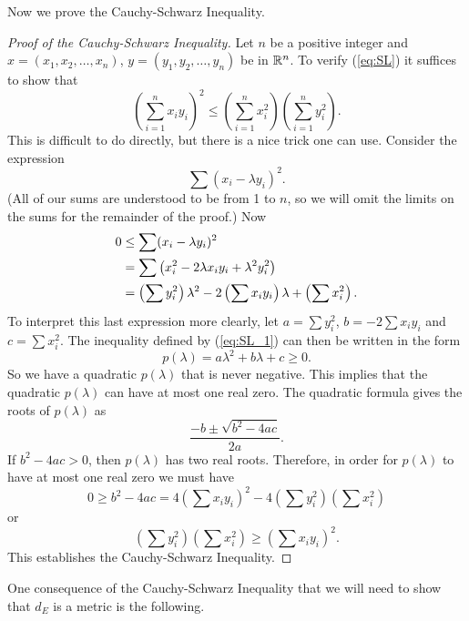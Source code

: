 {\begin{comment}
	\item Here we have 
	\[\sum_{i=1}^3 x_iy_i = (1)(-4) + (2)(0) + (-3)(-1) = -1\]
	and
	\[\left(\sqrt{\sum_{i=1}^3 x_i^2}\right) \left(\sqrt{\sum_{i=1}^3 y_i^2}\right) = \sqrt{1+4+9}\sqrt{16+0+1} = \sqrt{238} \approx 15.4.\]

	\ea

\end{comment}

Now we prove the Cauchy-Schwarz Inequality.

\begin{proof}[Proof of the Cauchy-Schwarz Inequality]  Let $n$ be a positive integer and $x = (x_1, x_2, \ldots, x_n)$, $y=(y_1, y_2, \ldots, y_n)$ be in $\mathbb{R}^n$. To verify (\ref{eq:SL}) it suffices to show that 
\[\left(\sum_{i=1}^n x_iy_i\right)^2 \leq  \left(\sum_{i=1}^n x_i^2\right) \left(\sum_{i=1}^n y_i^2\right).\]
This is difficult to do directly, but there is a nice trick one can use.
Consider the expression
\[\sum (x_i-\lambda y_i)^2.\]
(All of our sums are understood to be from 1 to $n$, so we will omit the limits on the sums for the remainder of the proof.) Now
\begin{align}
0 & \leq \sum (x_i-\lambda y_i)^2 \notag \\
	&= \sum \left(x_i^2 - 2\lambda x_iy_i + \lambda^2 y_i^2 \right) \notag \\
	&= \left( \sum y_i^2 \right)\lambda^2 - 2\left(\sum x_iy_i\right) \lambda + \left(\sum x_i^2\right). \label{eq:SL_1}
\end{align}
To interpret this last expression more clearly, let $a=\sum y_i^2$, $b=-2\sum x_iy_i$ and $c = \sum x_i^2$. The inequality defined by (\ref{eq:SL_1}) can then be written in the form
\[p(\lambda) = a \lambda^2 + b \lambda + c \geq 0.\]
So we have a quadratic $p(\lambda)$ that is never negative. This implies that the quadratic $p(\lambda)$ can have at most one real zero. The quadratic formula gives the roots of $p(\lambda)$ 
as
\[\frac{-b \pm \sqrt{b^2-4ac}}{2a}.\]
If $b^2-4ac > 0$, then $p(\lambda)$ has two real roots. Therefore, in order for $p(\lambda)$ to have at most one real zero we must have
\[0 \geq b^2-4ac = 4 \left(\sum x_iy_i\right)^2 - 4\left(\sum y_i^2\right)\left(\sum x_i^2\right)\]
or
\[\left(\sum y_i^2\right)\left(\sum x_i^2\right) \geq \left(\sum x_iy_i\right)^2.\]
This establishes the Cauchy-Schwarz Inequality.
\end{proof}

One consequence of the Cauchy-Schwarz Inequality that we will need to show that $d_E$ is a metric is the following.

}
